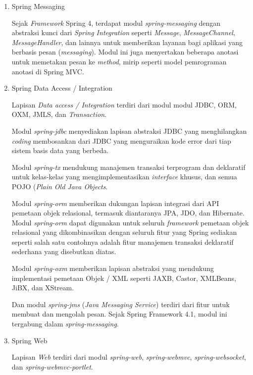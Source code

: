 \documentclass[pdftex,12pt, oneside]{article}
\begin{document}
\begin{enumerate}
\begin{enumerate}
\begin{enumerate}[1)]
    \item Spring Messaging    
    
    Sejak \textit{Framework} Spring 4, terdapat modul \textit{spring-messaging} dengan abstraksi kunci dari \textit{Spring Integration} seperti \textit{Message}, \textit{MessageChannel}, \textit{MessageHandler}, dan lainnya untuk memberikan layanan bagi aplikasi yang berbasis pesan (\textit{messaging}). Modul ini juga menyertakan beberapa anotasi untuk memetakan pesan ke \textit{method}, mirip seperti model pemrograman anotasi di Spring MVC.
    
    
    \item Spring Data Access / Integration
    
    Lapisan \textit{Data access / Integration} terdiri dari modul modul JDBC, ORM, OXM, JMLS, dan \textit{Transaction}.
    
    Modul \textit{spring-jdbc} menyediakan lapisan abstraksi JDBC yang menghilangkan \textit{coding} membosankan dari JDBC yang menguraikan kode error dari tiap sistem basis data yang berbeda.
    
    Modul \textit{spring-tx} mendukung manajemen transaksi terprogram dan deklaratif untuk kelas-kelas yang mengimplementasikan \textit{interface} khusus, dan semua POJO (\textit{Plain Old Java Objects}.
    
    Modul \textit{spring-orm} memberikan dukungan lapisan integrasi dari API pemetaan objek relasional, termasuk diantaranya JPA, JDO, dan Hibernate. Modul \textit{spring-orm} dapat digunakan untuk seluruh \textit{framework} pemetaan objek relasional yang dikombinasikan dengan seluruh fitur yang Spring sediakan seperti salah satu contohnya adalah fitur manajemen transaksi deklaratif sederhana yang disebutkan diatas.
    
    Modul \textit{spring-oxm} memberikan lapisan abstraksi yang mendukung implementasi pemetaan Objek / XML seperti JAXB, Castor, XMLBeans, JiBX, dan XStream.
    
    Dan modul \textit{spring-jms} (\textit{Java Messaging Service}) terdiri dari fitur untuk membuat dan mengolah pesan. Sejak Spring Framework 4.1, modul ini tergabung dalam \textit{spring-messaging}.
    
    \item Spring Web
    
    Lapisan \textit{Web} terdiri dari modul \textit{spring-web}, \textit{spring-webmvc}, \textit{spring-websocket}, dan \textit{spring-webmvc-portlet}.
    

\end{enumerate}
\end{enumerate}
\end{enumerate}
\end{document}
